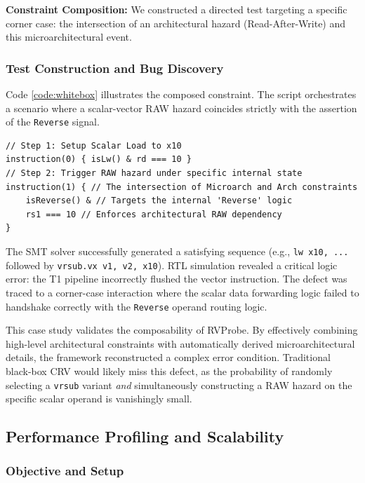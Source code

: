 \documentclass[sigconf]{acmart}
\begin{document}
\textbf{Constraint Composition:} We constructed a directed test targeting a specific corner case: the intersection of an architectural hazard (Read-After-Write) and this microarchitectural event. 

\subsubsection{Test Construction and Bug Discovery} Code \ref{code:whitebox} illustrates the composed constraint. The script orchestrates a scenario where a scalar-vector RAW hazard coincides strictly with the assertion of the \texttt{Reverse} signal.

\begin{lstlisting}[caption={Composed White-Box Constraint}, label=code:whitebox] 
// Step 1: Setup Scalar Load to x10 
instruction(0) { isLw() & rd === 10 }
// Step 2: Trigger RAW hazard under specific internal state 
instruction(1) { // The intersection of Microarch and Arch constraints 
    isReverse() & // Targets the internal 'Reverse' logic 
    rs1 === 10 // Enforces architectural RAW dependency 
} 
\end{lstlisting}

The SMT solver successfully generated a satisfying sequence (e.g., \texttt{lw x10, ...} followed by \texttt{vrsub.vx v1, v2, x10}). RTL simulation revealed a critical logic error: the T1 pipeline incorrectly flushed the vector instruction. The defect was traced to a corner-case interaction where the scalar data forwarding logic failed to handshake correctly with the \texttt{Reverse} operand routing logic.

This case study validates the composability of RVProbe. By effectively combining high-level architectural constraints with automatically derived microarchitectural details, the framework reconstructed a complex error condition. Traditional black-box CRV would likely miss this defect, as the probability of randomly selecting a \texttt{vrsub} variant \textit{and} simultaneously constructing a RAW hazard on the specific scalar operand is vanishingly small.

\subsection{Performance Profiling and Scalability}

\subsubsection{Objective and Setup}
\end{document}
